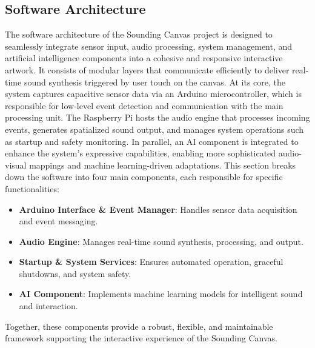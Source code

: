 \documentclass{article}
\begin{document}
\subsection{Software Architecture}
The software architecture of the Sounding Canvas project is designed to seamlessly integrate sensor input, audio processing, system management, and artificial intelligence components into a cohesive and responsive interactive artwork. It consists of modular layers that communicate efficiently to deliver real-time sound synthesis triggered by user touch on the canvas. \newline 
At its core, the system captures capacitive sensor data via an Arduino microcontroller, which is responsible for low-level event detection and communication with the main processing unit. The Raspberry Pi hosts the audio engine that processes incoming events, generates spatialized sound output, and manages system operations such as startup and safety monitoring. \newline 
In parallel, an AI component is integrated to enhance the system’s expressive capabilities, enabling more sophisticated audio-visual mappings and machine learning-driven adaptations. \newline 
This section breaks down the software into four main components, each responsible for specific functionalities:
\begin{itemize}
	\item \textbf{Arduino Interface \& Event Manager}: Handles sensor data acquisition and event messaging.
	\item \textbf{Audio Engine}: Manages real-time sound synthesis, processing, and output.
	\item \textbf{Startup \& System Services}: Ensures automated operation, graceful shutdowns, and system safety.
	\item \textbf{AI Component}: Implements machine learning models for intelligent sound and interaction.
\end{itemize}
\noindent
Together, these components provide a robust, flexible, and maintainable framework supporting the interactive experience of the Sounding Canvas.
\end{document}
